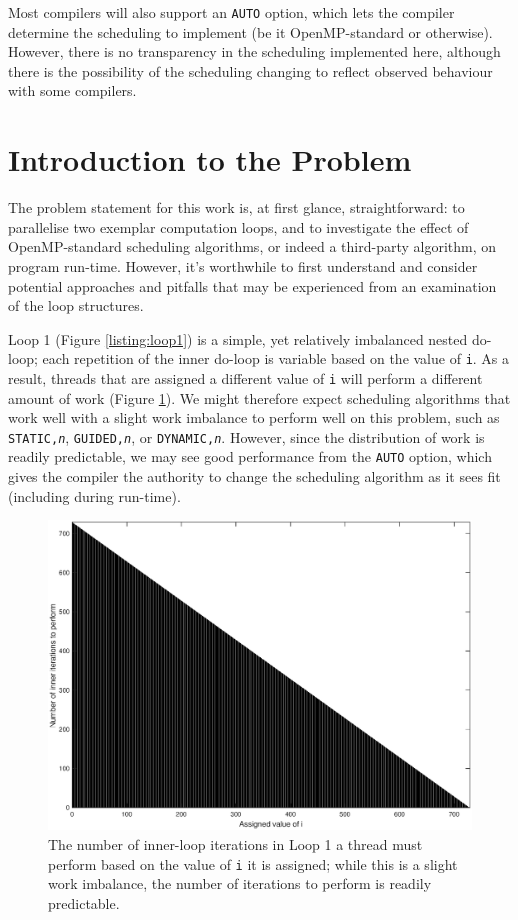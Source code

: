 \documentclass{article} %
\newcommand{\tp}{\texttt}
\begin{document}
Most compilers will also support an \tp{AUTO} option, which lets the compiler determine the scheduling to implement (be it OpenMP-standard or otherwise).
However, there is no transparency in the scheduling implemented here, although there is the possibility of the scheduling changing to reflect observed behaviour with some compilers.

\section*{Introduction to the Problem}

The problem statement for this work is, at first glance, straightforward: to parallelise two exemplar computation loops, and to investigate the effect of OpenMP-standard scheduling algorithms, or indeed a third-party algorithm, on program run-time.
However, it's worthwhile to first understand and consider potential approaches and pitfalls that may be experienced from an examination of the loop structures.

Loop 1 (Figure \ref{listing:loop1}) is a simple, yet relatively imbalanced nested do-loop; each repetition of the inner do-loop is variable based on the value of \texttt{i}.
As a result, threads that are assigned a different value of \tp{i} will perform a different amount of work (Figure \ref{fig:loop1work}).
We might therefore expect scheduling algorithms that work well with a slight work imbalance to perform well on this problem, such as \tp{STATIC,\textit{n}}, \tp{GUIDED,\textit{n}}, or \tp{DYNAMIC,\textit{n}}. 
However, since the distribution of work is readily predictable, we may see good performance from the \tp{AUTO} option, which gives the compiler the authority to change the scheduling algorithm as it sees fit (including during run-time).

\begin{figure}
    \centering
    \includegraphics[height=.3\textheight]{part1_plots/loop1_balancing.eps}
    \caption{The number of inner-loop iterations in Loop 1 a thread must perform based on the value of \tp{i} it is assigned; while this is a slight work imbalance, the number of iterations to perform is readily predictable.}
    \label{fig:loop1work}
\end{figure}
    
\end{document}
